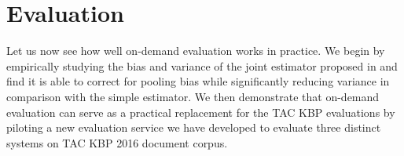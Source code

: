 \section{Evaluation}
\label{sec:evaluation}

Let us now see how well on-demand evaluation works in practice.
We begin by empirically studying the bias and variance of the joint estimator proposed in  and find it is able to correct for pooling bias while significantly reducing variance in comparison with the simple estimator.
We then demonstrate that on-demand evaluation can serve as a practical replacement for the TAC KBP evaluations by piloting a new evaluation service we have developed to evaluate three distinct systems on TAC KBP 2016 document corpus.

